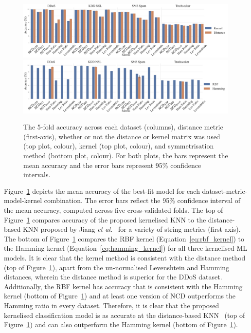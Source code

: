 \documentclass[preprint,12pt]{article}
\begin{document}
\begin{figure}[!htb]
    \centering
    \includegraphics[width=0.99\textwidth]{images/accuracy_vs_kernel.pdf}
    \hfill
    \includegraphics[width=0.99\textwidth]{images/accuracy_vs_rbf_or_hamming.pdf}
    \caption{
    The 5-fold accuracy across each dataset (columns), distance metric (first-axis), whether or not the distance or kernel matrix was used (top plot, colour), kernel (top plot, colour), and symmetrisation method (bottom plot, colour).
    For both plots, the bars represent the mean accuracy and the error bars represent 95\% confidence intervals.
    }
    \label{fig:baseline}
\end{figure}


Figure~\ref{fig:baseline} depicts the mean accuracy of the best-fit model for each dataset-metric-model-kernel combination.
The error bars reflect the 95\% confidence interval of the mean accuracy, computed across five cross-validated folds.
The top of Figure~\ref{fig:baseline} compares accuracy of the proposed kernelised KNN to the distance-based KNN proposed by Jiang \textit{et al.}~\cite{jiang2022less} for a variety of string metrics (first axis).
The bottom of Figure~\ref{fig:baseline} compares the RBF kernel (Equation~\ref{eq:rbf_kernel}) to the Hamming kernel (Equation~\ref{eq:hamming_kernel}) for all three kernelised ML models.
It is clear that the kernel method is consistent with the distance method (top of Figure~\ref{fig:baseline}), apart from the un-normalised Levenshtein and Hamming distances, wherein the distance method is superior for the DDoS dataset.
Additionally, the RBF kernel has accuracy that is consistent with the Hamming kernel (bottom of Figure~\ref{fig:baseline}) and at least one version of NCD outperforms the Hamming ratio in every dataset.
Therefore, it is clear that the proposed kernelised classification model is as accurate at the distance-based KNN~\cite{jiang2022less} (top of Figure~\ref{fig:baseline}) and can also outperform the Hamming kernel (bottom of Figure~\ref{fig:baseline}).
\end{document}
